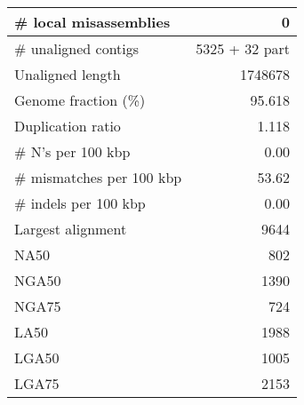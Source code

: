 \documentclass[12pt,a4paper]{article}
\begin{document}
\begin{table}[ht]
\begin{center}
\begin{tabular}{|l*{1}{|r}|}
\# local misassemblies & 0 \\ \hline
\# unaligned contigs & 5325 + 32 part \\ \hline
Unaligned length & 1748678 \\ \hline
Genome fraction (\%) & 95.618 \\ \hline
Duplication ratio & 1.118 \\ \hline
\# N's per 100 kbp & 0.00 \\ \hline
\# mismatches per 100 kbp & 53.62 \\ \hline
\# indels per 100 kbp & 0.00 \\ \hline
Largest alignment & 9644 \\ \hline
NA50 & 802 \\ \hline
NGA50 & 1390 \\ \hline
NGA75 & 724 \\ \hline
LA50 & 1988 \\ \hline
LGA50 & 1005 \\ \hline
LGA75 & 2153 \\ \hline
\end{tabular}
\end{center}
\end{table}
\end{document}
